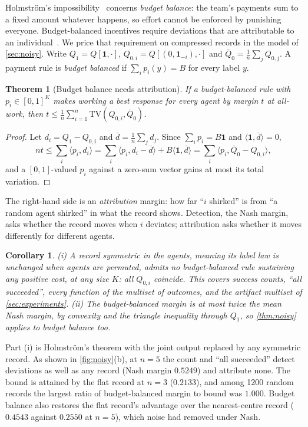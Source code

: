 \documentclass[sigconf,anonymous,acmthm=false]{aamas}
\theoremstyle{acmplain}
\newtheorem{theorem}{Theorem}
\newtheorem{corollary}{Corollary}
\theoremstyle{acmdefinition}
\newcommand{\TV}{\mathrm{TV}}
\begin{document}
Holmstr\"om's impossibility~\cite{holmstrom1982teams} concerns \emph{budget balance}: the
team's payments sum to a fixed amount whatever happens, so effort cannot be enforced by
punishing everyone. Budget-balanced incentives require deviations that are attributable to
an individual~\cite{legrosmatthews1993,rahmanobara2010}. We price that requirement on
compressed records in the model of \cref{sec:noisy}. Write $Q_1=Q[\mathbf1,\cdot]$,
$Q_{0,i}=Q[(0,\mathbf1_{-i}),\cdot]$ and $\bar Q_0=\frac1n\sum_jQ_{0,j}$. A payment rule is
\emph{budget balanced} if $\sum_ip_i(y)=B$ for every label $y$.

\begin{theorem}[Budget balance needs attribution]\label{thm:bb}
If a budget-balanced rule with $p_i\in[0,1]^K$ makes working a best response for every agent
by margin $t$ at all-work, then $t\le\frac1n\sum_{i=1}^n\TV(Q_{0,i},\bar Q_0)$.
\end{theorem}

\begin{proof}
Let $d_i=Q_1-Q_{0,i}$ and $\bar d=\frac1n\sum_jd_j$. Since $\sum_ip_i=B\mathbf1$ and
$\langle\mathbf1,\bar d\rangle=0$,
\[ nt\le\sum_i\langle p_i,d_i\rangle=\sum_i\langle p_i,d_i-\bar d\rangle+B\langle\mathbf1,\bar d\rangle=\sum_i\langle p_i,\bar Q_0-Q_{0,i}\rangle, \]
and a $[0,1]$-valued $p_i$ against a zero-sum vector gains at most its total variation.
\end{proof}

The right-hand side is an \emph{attribution} margin: how far ``$i$ shirked'' is from ``a
random agent shirked'' in what the record shows. Detection, the Nash margin, asks whether
the record moves when $i$ deviates; attribution asks whether it moves differently for
different agents.

\begin{corollary}\label{cor:bb}
(i) A record symmetric in the agents, meaning its label law is unchanged when agents are
permuted, admits no budget-balanced rule sustaining any positive cost, at any size $K$: all
$Q_{0,i}$ coincide. This covers success counts, ``all succeeded'', every function of the
multiset of outcomes, and the artifact multiset of \cref{sec:experiments}. (ii) The
budget-balanced margin is at most twice the mean Nash margin, by convexity and the triangle
inequality through $Q_1$, so \cref{thm:noisy} applies to budget balance too.
\end{corollary}

Part (i) is Holmstr\"om's theorem with the joint output replaced by any symmetric record. As
shown in \cref{fig:noisy}(b), at $n=5$ the count and ``all succeeded'' detect deviations as
well as any record (Nash margin $0.5249$) and attribute none. The bound is attained by the
flat record at $n=3$ ($0.2133$), and among 1200 random records the largest ratio of
budget-balanced margin to bound was $1.000$. Budget balance also restores the flat record's
advantage over the nearest-centre record ($0.4543$ against $0.2550$ at $n=5$), which noise
had removed under Nash.
\end{document}
